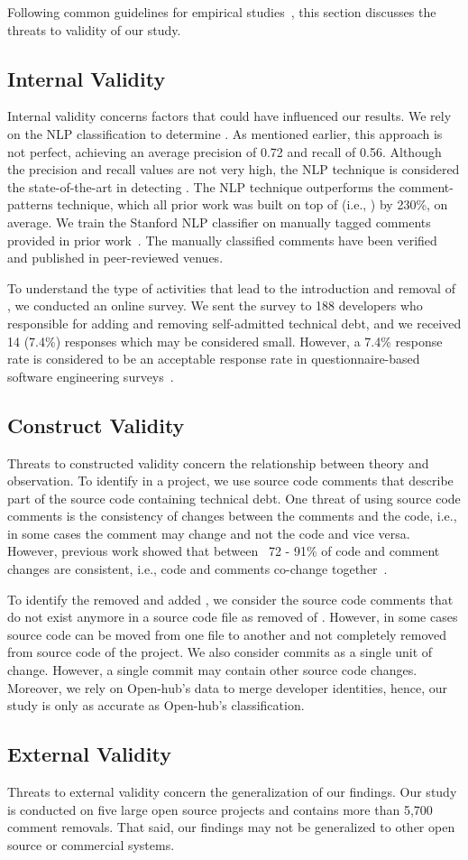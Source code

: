 Following common guidelines for empirical studies~\cite{yin2013case},  this section discusses the threats to validity of our study.

\subsection{Internal Validity} Internal validity concerns factors that could
have influenced our results. We rely on the NLP classification to determine \SATD. As mentioned earlier, this approach is not perfect, achieving an average precision of 0.72 and recall of 0.56. Although the precision and recall values are not very high, the NLP technique is considered the state-of-the-art in detecting \SATD. The NLP technique outperforms the comment-patterns technique, which all prior work was built on top of (i.e., \cite{Wehaibi2016SANER,Bavota2016MSR,Potdar2014ICSME}) by 230\%, on average. We train the Stanford NLP classifier on manually tagged \SATD comments provided in prior work~\cite{Maldonado2015TSE}. The manually classified comments have been verified and published in peer-reviewed venues.

To understand the type of activities that lead to the introduction and removal of \SATD, we conducted an online survey. We sent the survey to 188 developers who responsible for adding and removing self-admitted technical debt, and we received 14 (7.4\%) responses which may be considered small. However, a 7.4\% response rate is considered to be an acceptable response rate in questionnaire-based software engineering surveys~\cite{singer2008software}.

\subsection{Construct Validity} Threats to constructed validity concern the relationship between theory and observation.
To identify \SATD in a project, we use source code comments that describe part of the source code containing technical debt. One threat of using source code comments is the consistency of changes between the comments and the code, i.e., in some cases the comment may change and not the code and vice versa. However, previous work showed that between ~72 - 91\% of code and comment changes are consistent, i.e., code and comments co-change together~\cite{Potdar2014ICSME}. 


To identify the removed and added \SATD, we consider the source code comments that do not exist anymore in a source code file as removed of \SATD. However, in some cases source code can be moved from one file to another and not completely removed from source code of the project. We also consider commits as a single unit of change. However, a single commit may contain other source code changes. Moreover, we rely on Open-hub's data to merge developer identities, hence, our study is only as accurate as Open-hub's classification.

\subsection{External Validity} Threats to external validity concern the generalization of our findings. Our study is conducted on five large open source projects and contains more than 5,700 comment removals. That said, our findings may not be generalized to other open source or commercial systems.